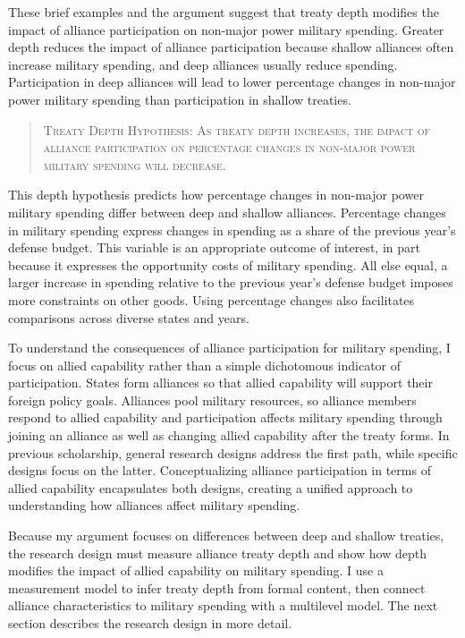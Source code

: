 \documentclass[12pt]{article}
\begin{document}
 
These brief examples and the argument suggest that treaty depth modifies the impact of alliance participation on non-major power military spending. 
Greater depth reduces the impact of alliance participation because shallow alliances often increase military spending, and deep alliances usually reduce spending.  
Participation in deep alliances will lead to lower percentage changes in non-major power military spending than participation in shallow treaties. 
 

\begin{quote}
\textsc{Treaty Depth Hypothesis: As treaty depth increases, the impact of alliance participation on percentage changes in non-major power military spending will decrease.}
\end{quote}


This depth hypothesis predicts how percentage changes in non-major power military spending differ between deep and shallow alliances. 
Percentage changes in military spending express changes in spending as a share of the previous year's defense budget.
This variable is an appropriate outcome of interest, in part because it expresses the opportunity costs of military spending. 
All else equal, a larger increase in spending relative to the previous year's defense budget imposes more constraints on other goods. 
Using percentage changes also facilitates comparisons across diverse states and years. 


To understand the consequences of alliance participation for military spending, I focus on allied capability rather than a simple dichotomous indicator of participation.
States form alliances so that allied capability will support their foreign policy goals. 
Alliances pool military resources, so alliance members respond to allied capability and participation affects military spending through joining an alliance as well as changing allied capability after the treaty forms. 
In previous scholarship, general research designs address the first path, while specific designs focus on the latter. 
Conceptualizing alliance participation in terms of allied capability encapsulates both designs, creating a unified approach to understanding how alliances affect military spending. 


Because my argument focuses on differences between deep and shallow treaties, the research design must measure alliance treaty depth and show how depth modifies the impact of allied capability on military spending.  
I use a measurement model to infer treaty depth from formal content, then connect alliance characteristics to military spending with a multilevel model. 
The next section describes the research design in more detail. 
\end{document}
